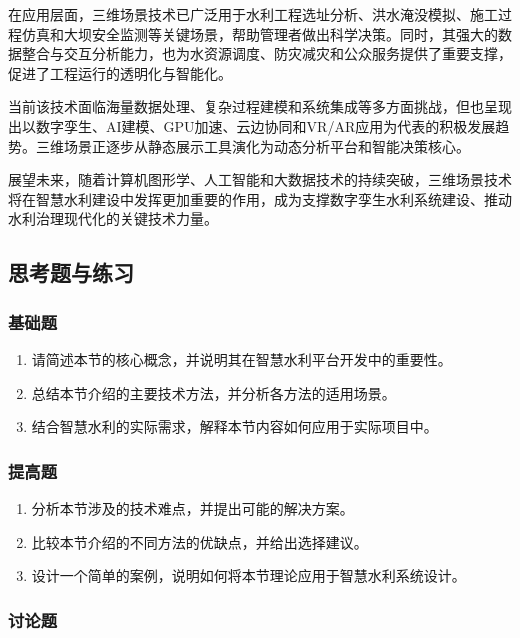 在应用层面，三维场景技术已广泛用于水利工程选址分析、洪水淹没模拟、施工过程仿真和大坝安全监测等关键场景，帮助管理者做出科学决策。同时，其强大的数据整合与交互分析能力，也为水资源调度、防灾减灾和公众服务提供了重要支撑，促进了工程运行的透明化与智能化。

当前该技术面临海量数据处理、复杂过程建模和系统集成等多方面挑战，但也呈现出以数字孪生、AI建模、GPU加速、云边协同和VR/AR应用为代表的积极发展趋势。三维场景正逐步从静态展示工具演化为动态分析平台和智能决策核心。

展望未来，随着计算机图形学、人工智能和大数据技术的持续突破，三维场景技术将在智慧水利建设中发挥更加重要的作用，成为支撑数字孪生水利系统建设、推动水利治理现代化的关键技术力量。

\subsection{思考题与练习}\label{ux601dux8003ux9898ux4e0eux7ec3ux4e60-2}

\subsubsection{基础题}\label{ux57faux7840ux9898-2}

\begin{enumerate}
\def\labelenumi{\arabic{enumi}.}
\tightlist
\item
  请简述本节的核心概念，并说明其在智慧水利平台开发中的重要性。
\item
  总结本节介绍的主要技术方法，并分析各方法的适用场景。
\item
  结合智慧水利的实际需求，解释本节内容如何应用于实际项目中。
\end{enumerate}

\subsubsection{提高题}\label{ux63d0ux9ad8ux9898-2}

\begin{enumerate}
\def\labelenumi{\arabic{enumi}.}
\setcounter{enumi}{3}
\tightlist
\item
  分析本节涉及的技术难点，并提出可能的解决方案。
\item
  比较本节介绍的不同方法的优缺点，并给出选择建议。
\item
  设计一个简单的案例，说明如何将本节理论应用于智慧水利系统设计。
\end{enumerate}

\subsubsection{讨论题}\label{ux8ba8ux8bbaux9898-2}

